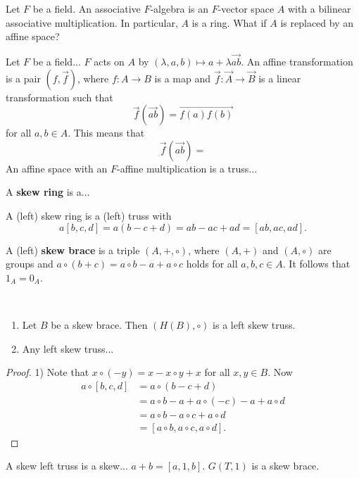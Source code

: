 \documentclass{svmult}
\begin{document}
Let $F$ be a field. An associative $F$-algebra is an $F$-vector space $A$ 
with a bilinear associative multiplication. In particular, $A$ is a ring. What if $A$ is replaced by 
an affine space?

\begin{example}
    Let $F$ be a field...
    $F$ acts on $A$ by $(\lambda,a,b)\mapsto a+\lambda\overrightarrow{ab}$. An affine
    transformation is a pair $\left(f,\overrightarrow{f}\right)$, where 
    $f\colon A\to B$ is a map and $\overrightarrow{f}\colon \overrightarrow{A}\to\overrightarrow{B}$ is a linear
    transformation such that 
    \[
    \overrightarrow{f}\left(\overrightarrow{ab}\right)=\overrightarrow{f(a)f(b)}
    \]
    for all $a,b\in A$. This means that
    \[
        \overrightarrow{f}\left(\overrightarrow{ab}\right)
        =
    \]
    An affine space with an $F$-affine multiplication is a truss... 
\end{example}

A \textbf{skew ring} is a...

\begin{example}
    A (left) skew ring is a (left) truss
    with
    \[
    a[b,c,d]=a(b-c+d)=ab-ac+ad=[ab,ac,ad].
    \]
\end{example}

A (left) \textbf{skew brace} is a triple $(A,+,\circ)$, where $(A,+)$ and $(A,\circ)$ are
groups and $a\circ(b+c)=a\circ b-a+a\circ c$ holds for all $a,b,c\in A$. It follows that
$1_A=0_A$.  

\begin{proposition}\
    \begin{enumerate}
        \item Let $B$ be a skew brace. Then $\left(H(B),\circ\right)$ is a left skew truss.
        \item Any left skew truss...
    \end{enumerate}  
\end{proposition}

\begin{proof}
    1) Note that 
    $x\circ(-y)=x-x\circ y+x$ for all $x,y\in B$. Now 
    \begin{align*}
    a\circ [b,c,d]&=a\circ (b-c+d)\\
    &=a\circ b-a+a\circ(-c)-a+a\circ d\\
    &=a\circ b-a\circ c+a\circ d\\
    &=[a\circ b,a\circ c,a\circ d].
    \end{align*}
\end{proof}

\begin{example}
    A skew left truss is a skew...
    $a+b=[a,1,b]$. 
    $G(T,1)$ is a skew brace. 
\end{example}




\end{document}
